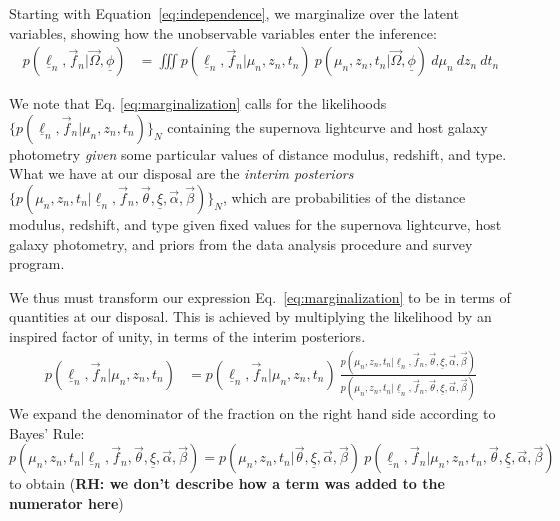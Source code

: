 \documentclass[12pt, onecolumn]{emulateapj}
\newcommand{\textul}{\underline}
\begin{document}

\begin{strip}
\begin{appendix}
\label{appendix:derivation}

Starting with Equation~\ref{eq:independence}, we marginalize over the latent variables, showing how the unobservable variables enter the inference:
\begin{align}
\label{eq:marginalization}
p(\textul{\ell}_{n}, \vec{f}_{n} | \vec{\Omega}, \textul{\phi}) &= \iiint p(\textul{\ell}_{n}, \vec{f}_{n} | \mu_{n}, z_{n}, t_{n})\ p(\mu_{n}, z_{n}, t_{n} | \vec{\Omega}, \textul{\phi})\ d\mu_{n}\ dz_{n}\ dt_{n}
\end{align}
 
  We note that Eq. \ref{eq:marginalization} calls for the likelihoods $\{p(\textul{\ell}_{n}, \vec{f}_{n} | \mu_{n}, z_{n}, t_{n})\}_{N}$ containing the supernova lightcurve and host galaxy photometry \textit{given} some particular values of distance modulus, redshift, and type. What we have at our disposal are the \textit{interim posteriors}  $\{p(\mu_{n}, z_{n}, t_{n} | \textul{\ell}_{n}, \vec{f}_{n}, \vec{\theta}, \textul{\xi}, \vec{\alpha}, \vec{\beta})\}_{N}$, which are probabilities of the distance modulus, redshift, and type given fixed values for the supernova lightcurve, host galaxy photometry, and priors from the data analysis procedure and survey program.

We thus must transform our expression Eq.~\ref{eq:marginalization} to be in terms of quantities at our disposal. This is achieved by multiplying the likelihood by an inspired factor of unity, in terms of the interim posteriors.
\begin{align}
\label{eq:unity}
p(\textul{\ell}_{n}, \vec{f}_{n} | \mu_{n}, z_{n}, t_{n}) &= p(\textul{\ell}_{n}, \vec{f}_{n} | \mu_{n}, z_{n}, t_{n})\ \frac{p(\mu_{n}, z_{n}, t_{n} | \textul{\ell}_{n}, \vec{f}_{n},\vec{\theta}, \textul{\xi}, \vec{\alpha}, \vec{\beta})}{p(\mu_{n}, z_{n}, t_{n} | \textul{\ell}_{n}, \vec{f}_{n}, \vec{\theta}, \textul{\xi}, \vec{\alpha}, \vec{\beta})}
\end{align}
We expand the denominator of the fraction on the right hand side according to Bayes' Rule: $p(\mu_{n}, z_{n}, t_{n} | \textul{\ell}_{n}, \vec{f}_{n}, \vec{\theta}, \textul{\xi}, \vec{\alpha}, \vec{\beta}) = p(\mu_{n}, z_{n}, t_{n} | \vec{\theta}, \textul{\xi}, \vec{\alpha}, \vec{\beta})\ p(\textul{\ell}_{n}, \vec{f}_{n} | \mu_{n}, z_{n}, t_{n}, \vec{\theta}, \textul{\xi}, \vec{\alpha}, \vec{\beta})$ to obtain (\textbf{RH: we don't describe how a term was added to the numerator here})


\end{appendix}
\end{strip}
\end{document}
